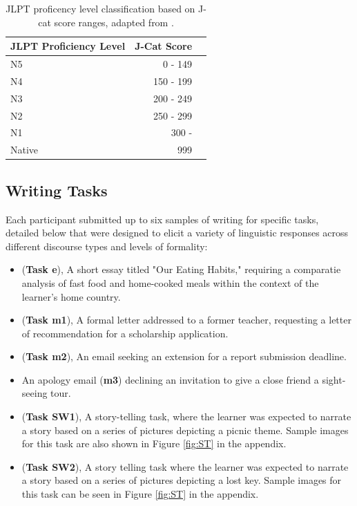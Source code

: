 \begin{table}[h!]
\centering
\begin{tabular}{lrl}
\hline \textbf{JLPT Proficiency Level} & \textbf{J-Cat Score}  \\ \hline
N5 & 0 - 149 \\
N4 & 150 - 199 \\
N3 & 200 - 249 \\
N2 & 250 - 299 \\
N1 & 300 - \\
Native & 999\\
\hline
\end{tabular}
\caption[Proficency Levels]{JLPT proficency level classification based on J-cat score ranges, adapted from
\cite{jcat_interpretation_guide}.}
\label{tab:proficency-table}
\end{table}

\subsection{Writing Tasks}

Each participant submitted up to six samples of writing for specific tasks, detailed below that were designed to
elicit a variety of linguistic responses across different discourse types and levels of formality:
\begin{itemize}
    \item (\textbf{Task e}), A short essay titled "Our Eating Habits," requiring a comparatie analysis of fast food
    and home-cooked
    meals within the context of the learner's home country.
    \item (\textbf{Task m1}), A formal letter addressed to a former teacher, requesting a letter of recommendation
    for a scholarship
    application.
    \item (\textbf{Task m2}), An email seeking an extension for a report submission deadline.
    \item An apology email (\textbf{m3}) declining an invitation to give a close friend a sight-seeing tour.
    \item (\textbf{Task SW1}), A story-telling task, where the learner was expected to narrate a story based on a
    series of pictures depicting a picnic theme. Sample images for this task are also shown in Figure \ref{fig:ST}
    in the appendix.
    \item (\textbf{Task SW2}), A story telling task where the learner was expected to narrate a story based on a
    series of pictures depicting a lost key. Sample images for this task can be seen in Figure \ref{fig:ST} in the
    appendix.
\end{itemize}

